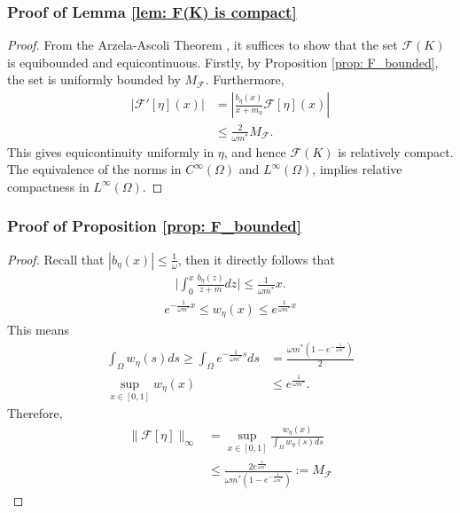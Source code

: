 \documentclass[10pt]{article}
\begin{document}
\subsubsection*{Proof of Lemma \ref{lem: F(K) is compact}}
\begin{proof}
    From the Arzela-Ascoli Theorem \cite{rudin_principles}, it suffices to show that the set $\mathcal{F}(K)$ is equibounded and equicontinuous. Firstly, by Proposition \ref{prop: F_bounded}, the set is uniformly bounded by $M_\mathcal{F}$. Furthermore, 
    \begin{align*}
        |\mathcal{F}'[\eta](x)| &= |\frac{b_\eta(x)}{x+m_\eta}\mathcal{F}[\eta](x)|\\
        &\leq \frac{2}{\omega m^*}M_\mathcal{F}.
    \end{align*}
    This gives equicontinuity uniformly in $\eta$, and hence $\mathcal{F}(K)$ is relatively compact. The equivalence of the norms in $C^\infty(\Omega)$ and $L^\infty(\Omega)$, implies relative compactness in $L^\infty(\Omega)$.
\end{proof}


\subsubsection*{Proof of Proposition \ref{prop: F_bounded}}
\begin{proof}
    Recall that $|b_\eta(x)| \leq \frac{1}{\omega}$, then it directly follows that
    \begin{align*}
        \Big|\int_0^x\frac{b_\eta(z)}{z+m}dz\Big|\leq \frac{1}{\omega m^*}x.
    \end{align*}
    \begin{align*}
        e^{-\frac{1}{\omega m^*}x} \leq w_\eta(x) \leq e^{\frac{1}{\omega m^*}x}
    \end{align*}
    This means
    \begin{align*}
        \int_{\Omega}w_\eta(s) ds \geq \int_{\Omega}e^{-\frac{1}{\omega m^*}s}ds &= \frac{\omega m^*(1-e^{-\frac{1}{\omega m^*}})}{2}\\
        \sup_{x\in[0,1]}w_\eta(x) &\leq e^\frac{1}{\omega m^*}.
    \end{align*}
    Therefore,
    \begin{align*}
        \|\mathcal{F}[\eta]\|_{\infty} &= \sup_{x \in[0,1]}\frac{w_\eta(x)}{\int_{\Omega}w_\eta(s)ds}\\
        &\leq \frac{2e^\frac{1}{\omega m^*}}{{\omega m^*}(1-e^{-\frac{1}{\omega m^*}})} :=M_\mathcal{F}
    \end{align*}
\end{proof}
\end{document}
